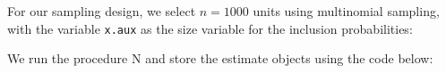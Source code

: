 \documentclass[
]{book}
\newenvironment{Shaded}{\begin{snugshade}}{\end{snugshade}}
\newcommand{\CommentTok}[1]{\textcolor[rgb]{0.56,0.35,0.01}{\textit{#1}}}
\newcommand{\FloatTok}[1]{\textcolor[rgb]{0.00,0.00,0.81}{#1}}
\newcommand{\FunctionTok}[1]{\textcolor[rgb]{0.13,0.29,0.53}{\textbf{#1}}}
\newcommand{\NormalTok}[1]{#1}
\newcommand{\OtherTok}[1]{\textcolor[rgb]{0.56,0.35,0.01}{#1}}
\newcommand{\SpecialCharTok}[1]{\textcolor[rgb]{0.81,0.36,0.00}{\textbf{#1}}}
\begin{document}
For our sampling design, we select \(n = 1000\) units using multinomial sampling,
with the variable \texttt{x.aux} as the size variable for the inclusion probabilities:

\begin{Shaded}
\end{Shaded}

We run the procedure N and store the estimate objects using the code below:
\end{document}
